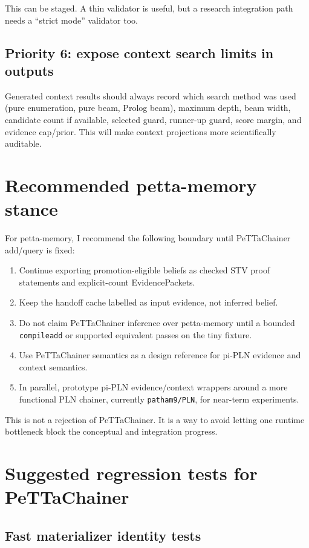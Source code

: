 \documentclass[11pt]{article}
\newcommand{\code}[1]{\texttt{#1}}
\newcommand{\fpath}[1]{\texttt{#1}}
\begin{document}
This can be staged.  A thin validator is useful, but a research integration path
needs a ``strict mode'' validator too.

\subsection{Priority 6: expose context search limits in outputs}

Generated context results should always record which search method was used
(pure enumeration, pure beam, Prolog beam), maximum depth, beam width, candidate
count if available, selected guard, runner-up guard, score margin, and evidence
cap/prior.  This will make context projections more scientifically auditable.

\section{Recommended petta-memory stance}

For petta-memory, I recommend the following boundary until PeTTaChainer add/query
is fixed:
\begin{enumerate}
  \item Continue exporting promotion-eligible beliefs as checked STV proof
  statements and explicit-count EvidencePackets.
  \item Keep the handoff cache labelled as input evidence, not inferred belief.
  \item Do not claim PeTTaChainer inference over petta-memory until a bounded
  \code{compileadd} or supported equivalent passes on the tiny fixture.
  \item Use PeTTaChainer semantics as a design reference for pi-PLN evidence and
  context semantics.
  \item In parallel, prototype pi-PLN evidence/context wrappers around a more
  functional PLN chainer, currently \fpath{patham9/PLN}, for near-term experiments.
\end{enumerate}

This is not a rejection of PeTTaChainer.  It is a way to avoid letting one
runtime bottleneck block the conceptual and integration progress.

\section{Suggested regression tests for PeTTaChainer}

\subsection{Fast materializer identity tests}
\end{document}
